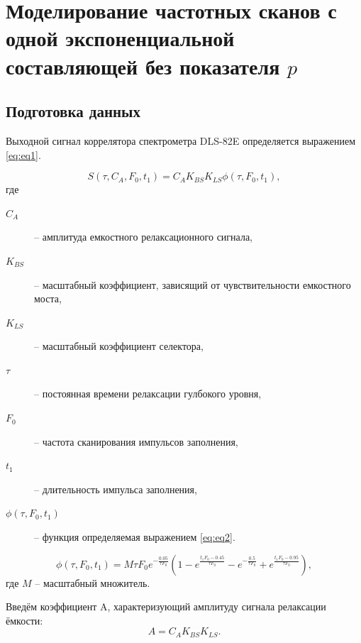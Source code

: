 \documentclass{report}
\begin{document}
    \chapter{Моделирование частотных сканов с одной экспоненциальной 
    составляющей без показателя $p$}

    \section{Подготовка данных}
        Выходной сигнал коррелятора спектрометра DLS-82E определяется 
        выражением \ref{eq:eq1}.

        \begin{equation}
            \label{eq:eq1}
            S\left(\tau,C_A,F_0, t_1\right) = C_A K_{BS} K_{LS} \phi\left(\tau,F_0,t_1\right),
        \end{equation}
        где
        \begin{description}
            \item[$C_A$] -- амплитуда емкостного релаксационного сигнала,
            \item[$K_{BS}$] -- масштабный коэффициент, зависящий от чувствительности 
            емкостного моста,
            \item[$K_{LS}$] -- масштабный коэффициент селектора,
            \item[$\tau$] -- постоянная времени релаксации гулбокого уровня,
            \item[$F_0$] -- частота сканирования импульсов заполнения,
            \item[$t_1$] -- длительность импульса заполнения,
            \item[$\phi\left(\tau,F_0,t_1\right)$] -- функция определяемая выражением
            \ref{eq:eq2}.
        \end{description}
        \begin{equation}
            \label{eq:eq2}
            \phi\left(\tau,F_0,t_1\right) = 
            M \tau F_0 e^{-\frac{0.05}{\tau F_0}}
            \left(1-e^{\frac{t_1 F_0-0.45}{\tau F_0}}
            -e^{-\frac{0.5}{\tau F_0}}+
            e^{\frac{t_1 F_0-0.95}{\tau F_0}}\right),
        \end{equation}
        где $M$ -- масштабный множитель.

        Введём коэффициент A, характеризующий амплитуду сигнала релаксации ёмкости:
        \begin{equation}
            \label{eq:eq3}
            A=C_A K_{BS} K_{LS}.
        \end{equation}
\end{document}
